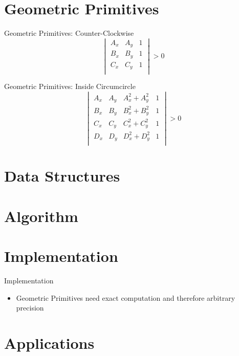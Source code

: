 \documentclass[aspectratio=169]{beamer}
\begin{document}
\section{Geometric Primitives}
\begin{frame}{Geometric Primitives: Counter-Clockwise}
  \[
    \begin{vmatrix}
      A_x & A_y & 1 \\
      B_x & B_y & 1 \\
      C_x & C_y & 1 \\
    \end{vmatrix}
    > 0
  \]
\end{frame}

\begin{frame}{Geometric Primitives: Inside Circumcircle}
  \[
    \begin{vmatrix}
      A_x & A_y & A_x^2 + A_y^2 & 1 \\
      B_x & B_y & B_x^2 + B_y^2 & 1 \\
      C_x & C_y & C_x^2 + C_y^2 & 1 \\
      D_x & D_y & D_x^2 + D_y^2 & 1 \\
    \end{vmatrix}
    > 0
  \]
\end{frame}

\section{Data Structures}

\section{Algorithm}

\section{Implementation}
\begin{frame}{Implementation}
  \begin{itemize}
    \item Geometric Primitives need exact computation and therefore arbitrary precision
  \end{itemize}
\end{frame}

\section{Applications}
\end{document}
